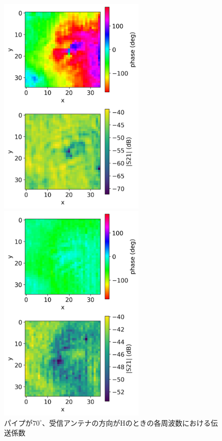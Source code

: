 \documentclass[11pt,a4paper,uplatex]{ujarticle}
\begin{document}
\begin{figure}[tbp]
    \begin{minipage}[b]{0.495\textwidth}
      \centering
      \includegraphics[keepaspectratio, width=70mm]{Images/python/rowdata/130.png}
    \end{minipage}
    \begin{minipage}[b]{0.495\textwidth}
      \centering
      \includegraphics[keepaspectratio, width=70mm]{Images/python/rowdata/180.png}
    \end{minipage}
    \caption{パイプが$70^{\circ}$、受信アンテナの方向がHのときの各周波数における伝送係数}
  \end{figure}
\end{document}
